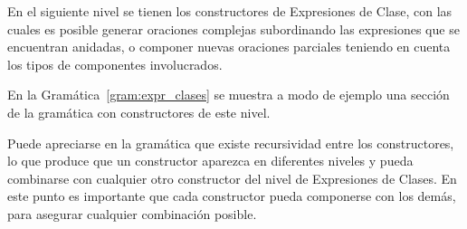 En el siguiente nivel se tienen los constructores de Expresiones de Clase, con las cuales es posible generar oraciones complejas subordinando las expresiones que se encuentran anidadas, o componer nuevas oraciones parciales teniendo en cuenta los tipos de componentes involucrados.

En la Gramática~\ref{gram:expr_clases} se muestra a modo de ejemplo una sección de la gramática con constructores de este nivel.
\begin{GrammarEnv}
\begin{grammar}
[(colon){$\rightarrow$}]
[(semicolon)$|$]
[(comma){}]
[(period){\vspace{0.3cm} \\}]
[(quote){\begin{bf}}{\end{bf}}]
[(nonterminal){$<$}{$>$}]
\end{grammar}
\label{gram:expr_clases}
\end{GrammarEnv}

Puede apreciarse en la gramática que existe recursividad entre los constructores, lo que produce que un constructor aparezca en diferentes niveles y pueda combinarse con cualquier otro constructor del nivel de Expresiones de Clases. En este punto es importante que cada constructor pueda componerse con los demás, para asegurar cualquier combinación posible.


